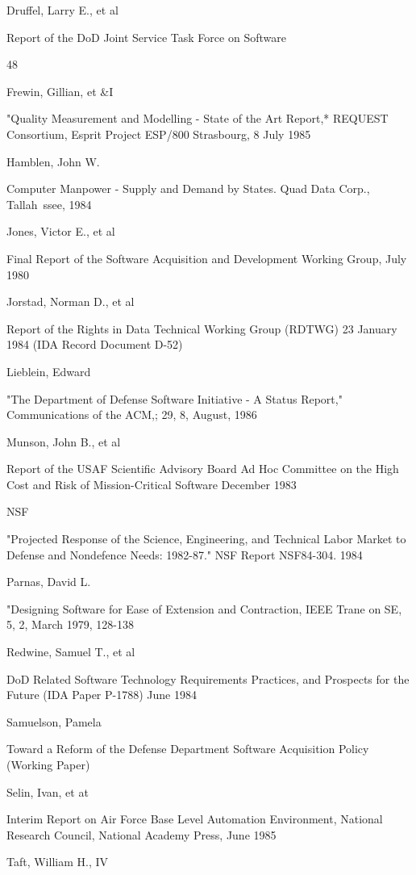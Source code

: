 \documentclass[12pt]{article}
\begin{document}
Druffel, Larry E., et al

Report of the DoD Joint Service Task Force on Software

48

Frewin, Gillian, et \&I

"Quality Measurement and Modelling - State of the Art
Report,* REQUEST Consortium, Esprit Project ESP/800 Strasbourg,
8 July 1985

Hamblen, John W.

Computer Manpower - Supply and Demand by States.
Quad Data Corp., Tallah~ssee, 1984

Jones, Victor E., et al

Final Report of the Software Acquisition and Development
Working Group, July 1980

Jorstad, Norman D., et al

Report of the Rights in Data Technical Working Group
(RDTWG) 23 January 1984 (IDA Record Document D-52)

Lieblein, Edward

"The Department of Defense Software Initiative - A Status
Report," Communications of the ACM,; 29, 8, August, 1986

Munson, John B., et al

Report of the USAF Scientific Advisory Board Ad Hoc
Committee on the High Cost and Risk of Mission-Critical
Software December 1983

NSF

"Projected Response of the Science, Engineering, and
Technical Labor Market to Defense and Nondefence Needs:
1982-87." NSF Report NSF84-304. 1984

Parnas, David L.

"Designing Software for Ease of Extension and
Contraction, IEEE Trane on SE, 5, 2, March 1979, 128-138

Redwine, Samuel T., et al

DoD Related Software Technology Requirements Practices,
and Prospects for the Future
(IDA Paper P-1788) June 1984

Samuelson, Pamela

Toward a Reform of the Defense Department Software
Acquisition Policy (Working Paper)

Selin, Ivan, et at

Interim Report on Air Force Base Level Automation
Environment, National Research Council, National Academy
Press, June 1985

Taft, William H., IV
\end{document}
